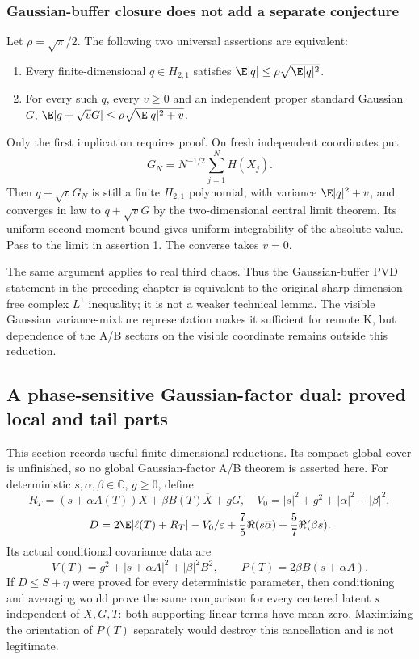 \subsubsection{Gaussian-buffer closure does not add a separate conjecture}
Let $\rho=\sqrt\pi/2$. The following two universal assertions are equivalent:
\begin{enumerate}
\item Every finite-dimensional $q\in H_{2,1}$ satisfies
      $\E|q|\le\rho\sqrt{\E|q|^2}$.
\item For every such $q$, every $v\ge0$ and an independent proper
      standard Gaussian $G$,
      $\E|q+\sqrt vG|\le\rho\sqrt{\E|q|^2+v}$.
\end{enumerate}
Only the first implication requires proof. On fresh independent coordinates put
\[
 G_N=N^{-1/2}\sum_{j=1}^N H(X_j).
\]
Then $q+\sqrt vG_N$ is still a finite $H_{2,1}$ polynomial, with
variance $\E|q|^2+v$, and converges in law to $q+\sqrt vG$ by the
two-dimensional central limit theorem. Its uniform second-moment
bound gives uniform integrability of the absolute value. Pass to the
limit in assertion 1. The converse takes $v=0$.

The same argument applies to real third chaos. Thus the Gaussian-buffer
PVD statement in the preceding chapter is equivalent to the original
sharp dimension-free complex $L^1$ inequality; it is not a weaker
technical lemma. The visible Gaussian variance-mixture representation
makes it sufficient for remote K, but dependence of the A/B sectors
on the visible coordinate remains outside this reduction.

\subsection{A phase-sensitive Gaussian-factor dual: proved local and tail parts}
\label{sec:shared-factor-local-dual}
This section records useful finite-dimensional reductions. Its compact
global cover is unfinished, so no global Gaussian-factor A/B theorem
is asserted here.
For deterministic $s,\alpha,\beta\in\mathbb C$, $g\ge0$, define
\[
 R_T=(s+\alpha A(T))X+\beta B(T)\overline X+gG,
 \quad V_0=|s|^2+g^2+|\alpha|^2+|\beta|^2,
\]
\[
 D=2\E|\ell(T)+R_T|-V_0/\varepsilon
      +\frac75\Re(s\overline\alpha)+\frac57\Re(\beta s).
\]
Its actual conditional covariance data are
\[
 V(T)=g^2+|s+\alpha A|^2+|\beta|^2B^2,
 \qquad P(T)=2\beta B(s+\alpha A).
\]
If $D\le S+\eta$ were proved for every deterministic parameter,
then conditioning and averaging would prove the same comparison for
every centered latent $s$ independent of $X,G,T$: both supporting
linear terms have mean zero. Maximizing the orientation of $P(T)$
separately would destroy this cancellation and is not legitimate.

